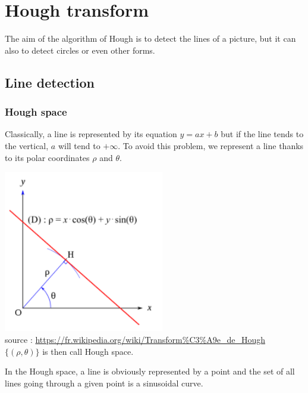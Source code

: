 \documentclass{article}
\begin{document}
\section{Hough transform}

The aim of the algorithm of Hough is to detect the lines of a picture, but it can also to detect circles or even other forms.

\subsection{Line detection}

\subsubsection{Hough space}

Classically, a line is represented by its equation $y = ax+b$ but if the line tends to the vertical, $a$ will tend to $+ \infty$. To avoid this problem, we represent a line thanks to its polar coordinates $\rho$ and $\theta$.

\includegraphics[width=7cm]{images/img17.png}\\
source : \url{https://fr.wikipedia.org/wiki/Transform%C3%A9e_de_Hough}\\

$\lbrace (\rho, \theta) \rbrace$ is then call Hough space.

In the Hough space, a line is obviously represented by a point and the set of all lines going through a given point is a sinusoidal curve.\\
\end{document}
